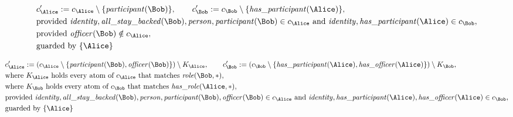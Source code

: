 \begin{align*}
&
c'_
{
\Alice
}
 := 
c_
{
\Alice
}
 \setminus 
\{
\mathit{\detokenize{
participant
}}
(
\Bob
)
\}
, \qquad 
c'_
{
\Bob
}
 := 
c_
{
\Bob
}
 \setminus 
\{
\mathit{\detokenize{
has_participant
}}
(
\Alice
)
\}
,\\
&
\text{provided } 
\mathit{\detokenize{
identity
}}
,
\mathit{\detokenize{
all_stay_backed
}}
(
\Bob
)
,
\mathit{\detokenize{
person
}}
,
\mathit{\detokenize{
participant
}}
(
\Bob
)
 \in c_
{
\Alice
}
 \text{ and } 
\mathit{\detokenize{
identity
}}
,
\mathit{\detokenize{
has_participant
}}
(
\Alice
)
 \in c_
{
\Bob
}
,\\
&
\text{provided } 
\mathit{\detokenize{
officer
}}
(
\Bob
)
 \notin c_
{
\Alice
}
,\\
&
\text{guarded by } \{
\Alice
\}
\end{align*}

\begin{align*}
&
c'_
{
\Alice
}
 := 
(c_
{
\Alice
}
 \setminus 
\{
\mathit{\detokenize{
participant
}}
(
\Bob
)
,
\mathit{\detokenize{
officer
}}
(
\Bob
)
\}
) \setminus K_
{
\Alice
}
, \qquad 
c'_
{
\Bob
}
 := 
(c_
{
\Bob
}
 \setminus 
\{
\mathit{\detokenize{
has_participant
}}
(
\Alice
)
,
\mathit{\detokenize{
has_officer
}}
(
\Alice
)
\}
) \setminus K_
{
\Bob
}
,\\
&
\text{where } K_
{
\Alice
}
 \text{ holds every atom of } c_
{
\Alice
}
 \text{ that matches } 
\mathit{\detokenize{
role
}}
(
\Bob
,
\ast
)
,\\
&
\text{where } K_
{
\Bob
}
 \text{ holds every atom of } c_
{
\Bob
}
 \text{ that matches } 
\mathit{\detokenize{
has_role
}}
(
\Alice
,
\ast
)
,\\
&
\text{provided } 
\mathit{\detokenize{
identity
}}
,
\mathit{\detokenize{
all_stay_backed
}}
(
\Bob
)
,
\mathit{\detokenize{
person
}}
,
\mathit{\detokenize{
participant
}}
(
\Bob
)
,
\mathit{\detokenize{
officer
}}
(
\Bob
)
 \in c_
{
\Alice
}
 \text{ and } 
\mathit{\detokenize{
identity
}}
,
\mathit{\detokenize{
has_participant
}}
(
\Alice
)
,
\mathit{\detokenize{
has_officer
}}
(
\Alice
)
 \in c_
{
\Bob
}
,\\
&
\text{guarded by } \{
\Alice
\}
\end{align*}

